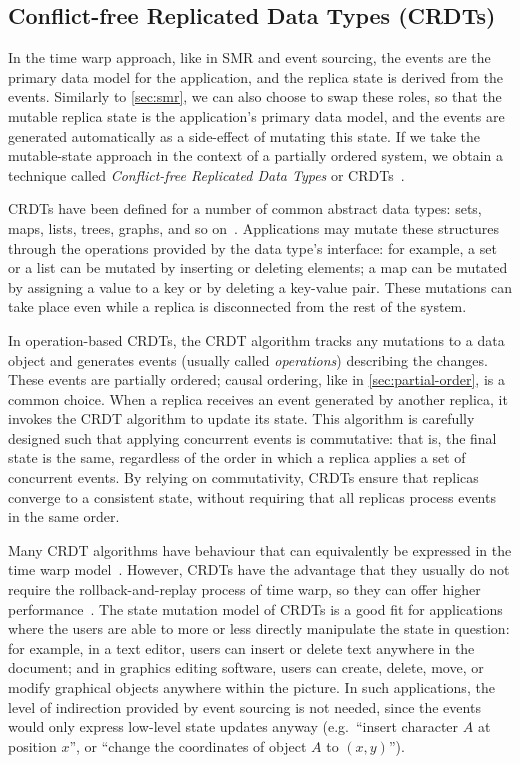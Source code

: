 \documentclass[sigconf]{acmart}
\begin{document}
\subsection{Conflict-free Replicated Data Types (CRDTs)}\label{sec:crdts}

In the time warp approach, like in SMR and event sourcing, the events are the primary data model for the application, and the replica state is derived from the events.
Similarly to \autoref{sec:smr}, we can also choose to swap these roles, so that the mutable replica state is the application's primary data model, and the events are generated automatically as a side-effect of mutating this state.
If we take the mutable-state approach in the context of a partially ordered system, we obtain a technique called \emph{Conflict-free Replicated Data Types} or CRDTs~\cite{Shapiro:2011}.

CRDTs have been defined for a number of common abstract data types: sets, maps, lists, trees, graphs, and so on~\cite{Shapiro:2011survey}.
Applications may mutate these structures through the operations provided by the data type's interface: for example, a set or a list can be mutated by inserting or deleting elements; a map can be mutated by assigning a value to a key or by deleting a key-value pair.
These mutations can take place even while a replica is disconnected from the rest of the system.

In operation-based CRDTs, the CRDT algorithm tracks any mutations to a data object and generates events (usually called \emph{operations}) describing the changes.
These events are partially ordered; causal ordering, like in \autoref{sec:partial-order}, is a common choice.
When a replica receives an event generated by another replica, it invokes the CRDT algorithm to update its state.
This algorithm is carefully designed such that applying concurrent events is commutative: that is, the final state is the same, regardless of the order in which a replica applies a set of concurrent events.
By relying on commutativity, CRDTs ensure that replicas converge to a consistent state, without requiring that all replicas process events in the same order.

Many CRDT algorithms have behaviour that can equivalently be expressed in the time warp model~\cite{Kleppmann:2018}.
However, CRDTs have the advantage that they usually do not require the rollback-and-replay process of time warp, so they can offer higher performance~\cite{dePorre:2019}.
The state mutation model of CRDTs is a good fit for applications where the users are able to more or less directly manipulate the state in question: for example, in a text editor, users can insert or delete text anywhere in the document; and in graphics editing software, users can create, delete, move, or modify graphical objects anywhere within the picture.
In such applications, the level of indirection provided by event sourcing is not needed, since the events would only express low-level state updates anyway (e.g.\ ``insert character $A$ at position $x$'', or ``change the coordinates of object $A$ to $(x,y)$'').
\end{document}
